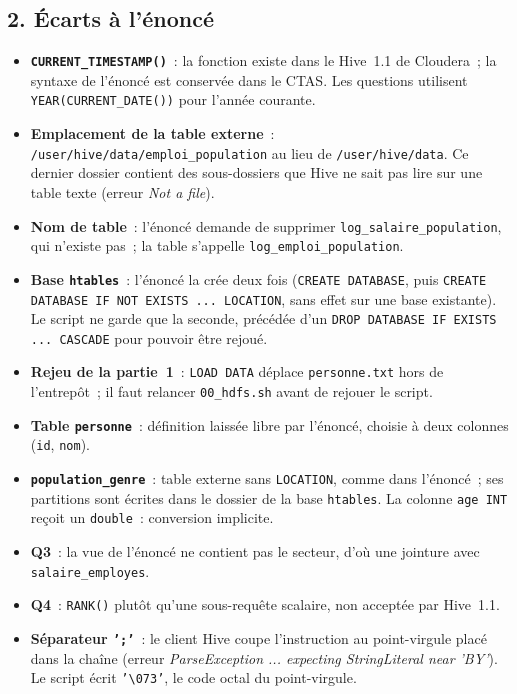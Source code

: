 \subsection*{2. Écarts à l'énoncé}
{}

\begin{itemize}[midpenalty=0, endpenalty=0]
	\item \textbf{\texttt{CURRENT\_TIMESTAMP()}}~: la fonction existe dans le Hive~1.1 de Cloudera~; la syntaxe de l'énoncé est conservée dans le CTAS. Les questions utilisent \texttt{YEAR(CURRENT\_DATE())} pour l'année courante.
	\item \textbf{Emplacement de la table externe}~: \texttt{/user/hive/data/emploi\_population} au lieu de \texttt{/user/hive/data}. Ce dernier dossier contient des sous-dossiers que Hive ne sait pas lire sur une table texte (erreur \textit{Not a file}).
	\item \textbf{Nom de table}~: l'énoncé demande de supprimer \texttt{log\_salaire\_population}, qui n'existe pas~; la table s'appelle \texttt{log\_emploi\_population}.
	\item \textbf{Base \texttt{htables}}~: l'énoncé la crée deux fois (\texttt{CREATE DATABASE}, puis \texttt{CREATE DATABASE IF NOT EXISTS ... LOCATION}, sans effet sur une base existante). Le script ne garde que la seconde, précédée d'un \texttt{DROP DATABASE IF EXISTS ... CASCADE} pour pouvoir être rejoué.
	\item \textbf{Rejeu de la partie~1}~: \texttt{LOAD DATA} déplace \texttt{personne.txt} hors de l'entrepôt~; il faut relancer \texttt{00\_hdfs.sh} avant de rejouer le script.
	\item \textbf{Table \texttt{personne}}~: définition laissée libre par l'énoncé, choisie à deux colonnes (\texttt{id}, \texttt{nom}).
	\item \textbf{\texttt{population\_genre}}~: table externe sans \texttt{LOCATION}, comme dans l'énoncé~; ses partitions sont écrites dans le dossier de la base \texttt{htables}. La colonne \texttt{age INT} reçoit un \texttt{double}~: conversion implicite.
	\item \textbf{Q3}~: la vue de l'énoncé ne contient pas le secteur, d'où une jointure avec \texttt{salaire\_employes}.
	\item \textbf{Q4}~: \texttt{RANK()} plutôt qu'une sous-requête scalaire, non acceptée par Hive~1.1.
	\item \textbf{Séparateur \texttt{';'}}~: le client Hive coupe l'instruction au point-virgule placé dans la chaîne (erreur \textit{ParseException ... expecting StringLiteral near 'BY'}). Le script écrit \texttt{'\textbackslash 073'}, le code octal du point-virgule.

\end{itemize}
